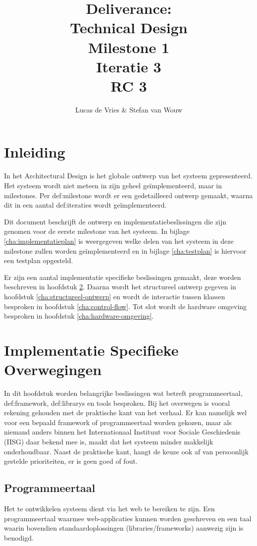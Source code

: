 \documentclass[a4paper,titlepage]{report}
\title{Deliverance:\\Technical Design\\Milestone 1\\Iteratie 3\\RC 3}
\author{Lucas de Vries \& Stefan van Wouw}
\begin{document}
\maketitle


\setcounter{secnumdepth}{5}
\setcounter{tocdepth}{1}

\tableofcontents
\pagebreak
\chapter{Inleiding}
  In het Architectural Design is het globale ontwerp van het systeem
  gepresenteerd. Het systeem wordt niet meteen in zijn geheel ge\"implementeerd,
  maar in milestones. Per \gls{def:milestone} wordt er een gedetailleerd ontwerp gemaakt,
  waarna dit in een aantal \glspl{def:iteratie} wordt ge\"implementeerd.

  Dit document beschrijft de ontwerp en implementatiebeslissingen die zijn
  genomen voor de eerste milestone van het systeem. In bijlage
  \ref{cha:implementatieplan} is weergegeven welke delen van het systeem in deze
  milestone zullen worden ge\"implementeerd en in bijlage \ref{cha:testplan} is
  hiervoor een testplan opgesteld.

  Er zijn een aantal implementatie specifieke beslissingen gemaakt, deze worden
  beschreven in hoofdstuk \ref{cha:overwegingen}. Daarna wordt het structureel
  ontwerp gegeven in hoofdstuk \ref{cha:structureel-ontwerp} en wordt de
  interactie tussen klassen besproken in hoofdstuk \ref{cha:control-flow}. Tot
  slot wordt de hardware omgeving besproken in hoofdstuk
  \ref{cha:hardware-omgeving}.

\chapter{Implementatie Specifieke Overwegingen}
  \label{cha:overwegingen}
  In dit hoofdstuk worden belangrijke beslissingen wat betreft programmeertaal,
  \gls{def:framework}, \glspl{def:library} en tools besproken. Bij het overwegen
  is vooral rekening gehouden met de praktische kant van het verhaal. Er kan
  namelijk wel voor een bepaald framework of programmeertaal worden gekozen,
  maar als niemand anders binnen het Internationaal Instituut voor Sociale
  Geschiedenis (IISG) daar bekend mee is, maakt dat het systeem minder makkelijk
  onderhoudbaar. Naast de praktische kant, hangt de keuze ook af van persoonlijk
  gestelde prioriteiten, er is geen goed of fout.

  \section{Programmeertaal} 
    Het te ontwikkelen systeem dient via het web te bereiken te zijn. Een
    programmeertaal waarmee web-applicaties kunnen worden geschreven en een taal
    waarin bovendien standaardoplossingen (libraries/frameworks) aanwezig zijn
    is benodigd. 
\end{document}
